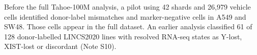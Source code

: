 \documentclass[
  11pt,
  letterpaper,
]{article}
\begin{document}
\relax Before the full Tahoe-100M analysis, a pilot using
42 shards and 26,979 vehicle cells identified donor-label mismatches and
marker-negative cells in A549 and SW48. Those cells appear in the full
dataset. An earlier analysis classified 61 of 128 donor-labelled LINCS2020 lines with
resolved RNA-seq states as Y-lost, XIST-lost or discordant (Note S10).
\end{document}
